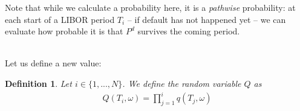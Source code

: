 \documentclass[12pt]{article}
\newtheorem{definition}[theorem]{Definition}
\begin{document}
	Note that while we calculate a probability here, it is a \emph{pathwise} probability: at each start of a LIBOR period $T_i$ -- if default has not happened yet -- we can evaluate how probable it is that $P^d$ survives the coming period.

	\\Let us define a new value:
	\begin{definition}\label{def:totalsuvivalprob}
		Let $i \in \{1, ..., N\}$. We define the random variable $Q$ as
		\begin{align*}
			Q(T_i, \omega) = \prod_{j=1}^{i}q(T_j, \omega)
		\end{align*}
	\end{definition}
\end{document}
